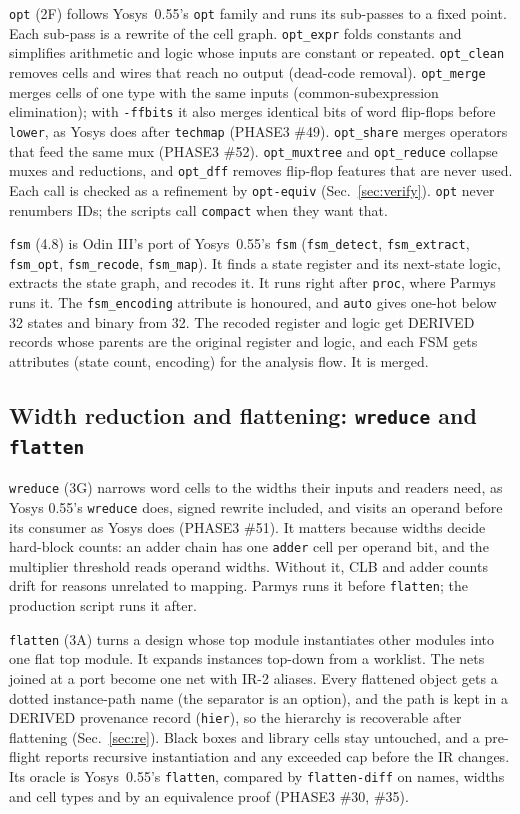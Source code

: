 \documentclass[conference]{IEEEtran}
\newcommand{\code}[1]{\texttt{#1}}
\begin{document}
\code{opt} (2F) follows Yosys~0.55's \code{opt} family and runs its sub-passes to a fixed point.
Each sub-pass is a rewrite of the cell graph.
\code{opt\_expr} folds constants and simplifies arithmetic and logic whose inputs are constant or
repeated. \code{opt\_clean} removes cells and wires that reach no output (dead-code removal).
\code{opt\_merge} merges cells of one type with the same inputs (common-subexpression
elimination); with \code{-ffbits} it also merges identical bits of word flip-flops before
\code{lower}, as Yosys does after \code{techmap} (PHASE3 \#49). \code{opt\_share} merges operators
that feed the same mux (PHASE3 \#52). \code{opt\_muxtree} and \code{opt\_reduce} collapse
muxes and reductions, and \code{opt\_dff} removes flip-flop features that are never used. Each
call is checked as a refinement by \code{opt-equiv} (Sec.~\ref{sec:verify}). \code{opt} never
renumbers IDs; the scripts call \code{compact} when they want that.

\code{fsm} (4.8) is Odin III's port of Yosys~0.55's \code{fsm} (\code{fsm\_detect},
\code{fsm\_extract}, \code{fsm\_opt}, \code{fsm\_recode}, \code{fsm\_map}). It finds a state
register and its next-state logic, extracts the state graph, and recodes it. It runs right after
\code{proc}, where Parmys runs it. The \code{fsm\_encoding} attribute is honoured, and
\code{auto} gives one-hot below 32 states and binary from 32. The recoded register and logic get
DERIVED records whose parents are the original register and logic, and each FSM gets attributes
(state count, encoding) for the analysis flow. It is merged.

\subsection{Width reduction and flattening: \code{wreduce} and \code{flatten}}

\code{wreduce} (3G) narrows word cells to the widths their inputs and readers need, as Yosys
0.55's \code{wreduce} does, signed rewrite included, and visits an operand before its consumer as Yosys does (PHASE3 \#51). It matters because widths decide hard-block
counts: an adder chain has one \code{adder} cell per operand bit, and the multiplier threshold
reads operand widths. Without it, CLB and adder counts drift for reasons unrelated to mapping.
Parmys runs it before \code{flatten}; the production script runs it after.

\code{flatten} (3A) turns a design whose top module instantiates other modules into one flat
top module. It expands instances top-down from a worklist. The nets joined at a port become one
net with IR-2 aliases. Every flattened object gets a dotted instance-path name (the separator is
an option), and the path is kept in a DERIVED provenance record (\code{hier}), so the hierarchy
is recoverable after flattening (Sec.~\ref{sec:re}). Black boxes and library cells stay
untouched, and a pre-flight reports recursive instantiation and any exceeded cap before the IR
changes. Its oracle is Yosys~0.55's \code{flatten}, compared by \code{flatten-diff} on names,
widths and cell types and by an equivalence proof (PHASE3 \#30, \#35).
\end{document}
